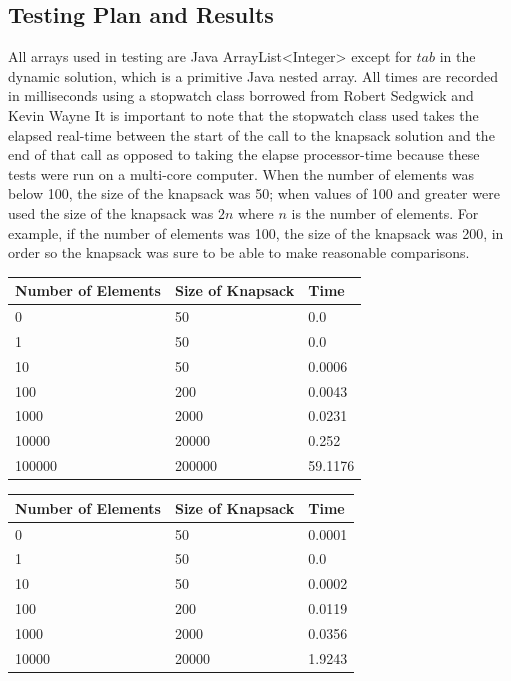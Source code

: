 \documentclass[onecolumn, 12pt, article]{IEEEtran}
\numberwithin{case}{problem}
\numberwithin{condition}{problem}
\numberwithin{condition}{subsection}
\numberwithin{definition}{section}
\theoremstyle{remark}
\numberwithin{question}{problem}
\theoremstyle{plain}
\numberwithin{answer}{problem}
\numberwithin{solution}{section}
\numberwithin{equation}{section}%
\begin{document}
\subsection{Testing Plan and Results}
All arrays used in testing are Java ArrayList<Integer> except for $tab$ in the dynamic solution, which is a primitive Java nested array. All times are recorded in milliseconds using a stopwatch class borrowed from Robert Sedgwick and Kevin Wayne \cite{stopwatch}
It is important to note that the stopwatch class used takes the elapsed real-time between the start of the call to the knapsack solution and the end of that call as opposed to taking the elapse processor-time because these tests were run on a multi-core computer.
When the number of elements was below 100, the size of the knapsack was 50; when values of 100 and greater were used the size of the knapsack was $2n$ where $n$ is the number of elements. For example, if the number of elements was 100, the size of the knapsack was 200, in order so the knapsack was sure to be able to make reasonable comparisons.
\newline
{}
\begin{center}
\begin{tabular}{|l|l|l|}
\hline Number of Elements & Size of Knapsack & Time \\
\hline 0 & 50 & 0.0 \\
\hline 1 & 50 & 0.0 \\
\hline 10 & 50 & 0.0006 \\
\hline 100 & 200 & 0.0043 \\
\hline 1000 & 2000 & 0.0231 \\
\hline 10000 & 20000 & 0.252 \\
\hline 100000 & 200000 & 59.1176 \\
\hline
\end{tabular}
\end{center}
\begin{center}
\begin{tabular}{|l|l|l|}
\hline Number of Elements & Size of Knapsack & Time \\
\hline 0 & 50 & 0.0001 \\
\hline 1 & 50 & 0.0 \\
\hline 10 & 50 & 0.0002 \\
\hline 100 & 200 & 0.0119 \\
\hline 1000 & 2000 & 0.0356 \\
\hline 10000 & 20000 & 1.9243 \\
\hline
\end{tabular}
\end{center}
\end{document}
